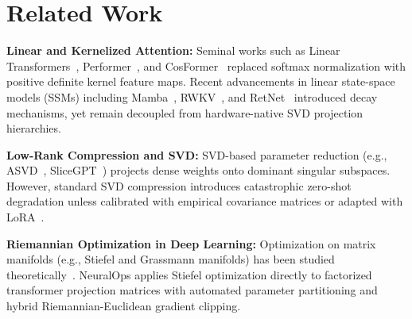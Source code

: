 \section{Related Work}
\label{sec:related}

\textbf{Linear and Kernelized Attention:} Seminal works such as Linear Transformers~\cite{katharopoulos2020transformers}, Performer~\cite{choromanski2020rethinking}, and CosFormer~\cite{qin2022cosformer} replaced softmax normalization with positive definite kernel feature maps. Recent advancements in linear state-space models (SSMs) including Mamba~\cite{gu2023mamba}, RWKV~\cite{peng2023rwkv}, and RetNet~\cite{sun2023retentive} introduced decay mechanisms, yet remain decoupled from hardware-native SVD projection hierarchies.

\textbf{Low-Rank Compression and SVD:} SVD-based parameter reduction (e.g., ASVD~\cite{yuan2023asvd}, SliceGPT~\cite{ashkboos2024slicegpt}) projects dense weights onto dominant singular subspaces. However, standard SVD compression introduces catastrophic zero-shot degradation unless calibrated with empirical covariance matrices or adapted with LoRA~\cite{hu2021lora}.

\textbf{Riemannian Optimization in Deep Learning:} Optimization on matrix manifolds (e.g., Stiefel and Grassmann manifolds) has been studied theoretically~\cite{absil2008optimization,edelman1998geometry}. NeuralOps applies Stiefel optimization directly to factorized transformer projection matrices with automated parameter partitioning and hybrid Riemannian-Euclidean gradient clipping.
